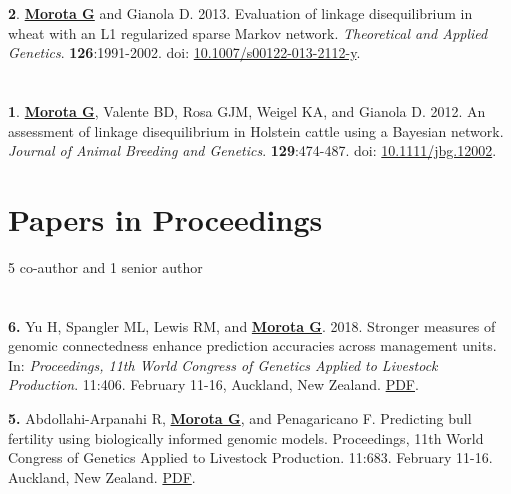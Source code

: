 \documentclass[margin,line,10pt]{res}
\newenvironment{list1}{
  \begin{list}{\ding{113}}{%
      \setlength{\itemsep}{0in}
      \setlength{\parsep}{0in} \setlength{\parskip}{0in}
      \setlength{\topsep}{0in} \setlength{\partopsep}{0in} 
      \setlength{\leftmargin}{0.17in}}}{\end{list}}
\begin{document}
\begin{resume}
\begin{list1}
\item [{\bf 2}.] {\bf \underline{Morota G}} and Gianola D. 2013.  Evaluation of linkage disequilibrium in wheat with an L1 regularized sparse Markov network.
  \emph{Theoretical and Applied Genetics}. {\bf 126}:1991-2002. doi: \textcolor{blue}{\href{http://dx.doi.org/10.1007/s00122-013-2112-y}{10.1007/s00122-013-2112-y}}. 
\end{list1}


\section{}
\begin{list1} 
\item [{\bf 1}.] {\bf \underline{Morota G}}, Valente BD, Rosa GJM, Weigel KA, and Gianola D. 2012.  
An assessment of linkage disequilibrium in Holstein cattle using a Bayesian network. \emph{Journal of Animal Breeding and Genetics}. {\bf 129}:474-487. doi: \textcolor{blue}{\href{http://dx.doi.org/10.1111/jbg.12002}{10.1111/jbg.12002}}. 
\end{list1}



\vspace{1.0cm}
\section{\sc Papers in Proceedings}
\vspace{0.9cm}
5 co-author and 1 senior author

\section{}
\begin{list1}
  
\item [\bf{6}.] Yu H, Spangler ML, Lewis RM, and {\bf \underline{Morota G}}. 2018. 
Stronger measures of genomic connectedness enhance prediction accuracies across management units. In: \emph{Proceedings, 11th World Congress of Genetics Applied to Livestock Production}. 11:406. February 11-16, Auckland, New Zealand. 
\textcolor{blue}{\href{http://www.wcgalp.org/proceedings/2018/stronger-measures-genomic-connectedness-enhance-prediction-accuracies-across}{PDF}}.  

\vspace{0.5cm}

\item [\bf{5}.] Abdollahi-Arpanahi R, {\bf \underline{Morota G}}, and Penagaricano F. Predicting bull fertility using biologically informed genomic models.  Proceedings, 11th World Congress of Genetics Applied to Livestock Production. 11:683. February 11-16. Auckland, New Zealand. \textcolor{blue}{\href{http://www.wcgalp.org/proceedings/2018/predicting-bull-fertility-using-biologically-informed-genomic-models}{PDF}}.  


\end{list1}
\end{resume}
\end{document}
